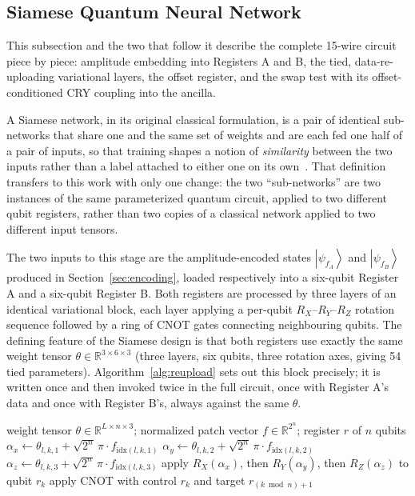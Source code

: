 \documentclass[conference]{IEEEtran}
\newcommand{\ket}[1]{\left|#1\right\rangle}
\begin{document}
\subsection{Siamese Quantum Neural Network}\label{sec:siamese}
This subsection and the two that follow it describe the complete 15-wire circuit piece by piece: amplitude embedding into Registers A and B, the tied, data-re-uploading variational layers, the offset register, and the swap test with its offset-conditioned CRY coupling into the ancilla.

A Siamese network, in its original classical formulation, is a pair of identical sub-networks that share one and the same set of weights and are each fed one half of a pair of inputs, so that training shapes a notion of \emph{similarity} between the two inputs rather than a label attached to either one on its own~\cite{siamese1993}. That definition transfers to this work with only one change: the two ``sub-networks'' are two instances of the same parameterized quantum circuit, applied to two different qubit registers, rather than two copies of a classical network applied to two different input tensors.

The two inputs to this stage are the amplitude-encoded states $\ket{\psi_{f_A}}$ and $\ket{\psi_{f_B}}$ produced in Section~\ref{sec:encoding}, loaded respectively into a six-qubit Register A and a six-qubit Register B. Both registers are processed by three layers of an identical variational block, each layer applying a per-qubit $R_X$--$R_Y$--$R_Z$ rotation sequence followed by a ring of CNOT gates connecting neighbouring qubits. The defining feature of the Siamese design is that both registers use exactly the same weight tensor $\theta\in\mathbb{R}^{3\times6\times3}$ (three layers, six qubits, three rotation axes, giving 54 tied parameters). Algorithm~\ref{alg:reupload} sets out this block precisely; it is written once and then invoked twice in the full circuit, once with Register A's data and once with Register B's, always against the same $\theta$.

\begin{algorithm}[t]
\caption{Tied re-uploading block, applied once per register}
\label{alg:reupload}
\begin{algorithmic}[1]
\Require weight tensor $\theta\in\mathbb{R}^{L\times n\times3}$; normalized patch vector $f\in\mathbb{R}^{2^n}$; register $r$ of $n$ qubits
    \State $\alpha_x \gets \theta_{l,k,1} + \sqrt{2^n}\,\pi\cdot f_{\mathrm{idx}(l,k,1)}$
    \State $\alpha_y \gets \theta_{l,k,2} + \sqrt{2^n}\,\pi\cdot f_{\mathrm{idx}(l,k,2)}$
    \State $\alpha_z \gets \theta_{l,k,3} + \sqrt{2^n}\,\pi\cdot f_{\mathrm{idx}(l,k,3)}$
    \State apply $R_X(\alpha_x)$, then $R_Y(\alpha_y)$, then $R_Z(\alpha_z)$ to qubit $r_k$
  \EndFor
    \State apply CNOT with control $r_k$ and target $r_{(k \bmod n)+1}$
  \EndFor
\EndFor
\end{algorithmic}
\end{algorithm}
\end{document}
